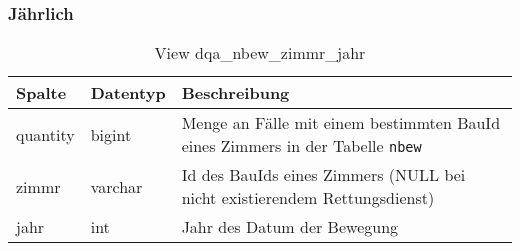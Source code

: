 \subsubsection{Jährlich} \label{subsubsec:bewZimmrJ}

\begin{table}[ht]
	\centering   
	\caption{View dqa\_nbew\_zimmr\_jahr}
	\label{tab:bewZimmrJ}
	\begin{tabular}{||l|l|p{10cm}||}
		\hline
		Spalte & Datentyp & Beschreibung \\ [0.5ex]
		\hline\hline
		quantity & bigint & Menge an Fälle mit einem bestimmten BauId eines Zimmers in der Tabelle \texttt{nbew}\\
		\hline
		zimmr & varchar & Id des BauIds eines Zimmers (NULL bei nicht existierendem Rettungsdienst)\\
		\hline
		jahr & int &  Jahr des Datum der Bewegung \\
		\hline		
	\end{tabular}
\end{table}